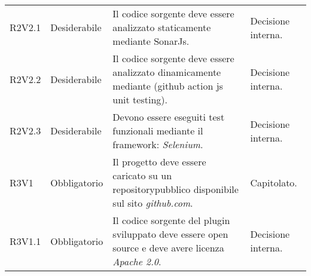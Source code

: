 \begin{longtable} {
		>{\centering}p{18mm} 
		>{\centering}p{28mm}
		>{}p{50mm} 
		>{}p{28mm}
		}
		R2V2.1 &
		Desiderabile &
		Il codice sorgente deve essere analizzato staticamente mediante SonarJs\glo . &
		Decisione interna.  \TBstrut \\ [2mm]
		
		R2V2.2 &
		Desiderabile &
		Il codice sorgente deve essere analizzato dinamicamente mediante (github action js unit testing). &
		Decisione interna.  \TBstrut \\ [2mm]
		
		R2V2.3 &
		Desiderabile &
		Devono essere eseguiti test funzionali mediante il framework: \textit{Selenium}. &
		Decisione interna.  \TBstrut \\ [2mm]
		
		R3V1 & 
		Obbligatorio & 
		Il progetto deve essere caricato su un repository\glosp pubblico disponibile sul sito \textit{github.com}. &
		Capitolato.  \TBstrut \\ [2mm]
		
		R3V1.1 & 
		Obbligatorio & 
		Il codice sorgente del plugin sviluppato deve essere open source e deve avere licenza \textit{Apache 2.0}.  &
		Decisione interna.  \TBstrut \\ [2mm]

	\end{longtable}
